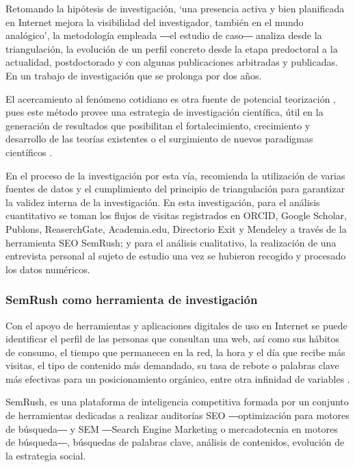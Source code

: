 \documentclass{textolivre}
\begin{document}
Retomando la hipótesis de investigación, ‘una presencia activa y bien planificada en Internet mejora la visibilidad del investigador, también en el mundo analógico’, la metodología empleada ―el estudio de caso― analiza desde la triangulación, la evolución de un perfil concreto desde la etapa predoctoral a la actualidad, postdoctorado y con algunas publicaciones arbitradas y publicadas. En un trabajo de investigación que se prolonga por dos años.

El acercamiento al fenómeno cotidiano es otra fuente de potencial teorización \cite{yacuzzi_estudio_2005}, pues este método provee una estrategia de investigación científica, útil en la generación de resultados que posibilitan el fortalecimiento, crecimiento y desarrollo de las teorías existentes o el surgimiento de nuevos paradigmas científicos \cite{martinez_carazo_metodo_2006}.

En el proceso de la investigación por esta vía, \textcite{martinez_carazo_metodo_2006} recomienda la utilización de varias fuentes de datos y el cumplimiento del principio de triangulación para garantizar la validez interna de la investigación. En esta investigación, para el análisis cuantitativo se toman los flujos de visitas registrados en ORCID, Google Scholar, Publons, ReaserchGate, Academia.edu, Directorio Exit y Mendeley a través de la herramienta SEO SemRush; y para el análisis cualitativo, la realización de una entrevista personal al sujeto de estudio una vez se hubieron recogido y procesado los datos numéricos.

\subsubsection{SemRush como herramienta de investigación}\label{sec-semrush}
Con el apoyo de herramientas y aplicaciones digitales de uso en Internet se puede identificar el perfil de las personas que consultan una web, así como sus hábitos de consumo, el tiempo que permanecen en la red, la hora y el día que recibe más visitas, el tipo de contenido más demandado, su tasa de rebote o palabras clave más efectivas para un posicionamiento orgánico, entre otra infinidad de variables \cite{fed_foro_de_economia_digital_herramientas_2016}.

SemRush, es una plataforma de inteligencia competitiva formada por un conjunto de herramientas dedicadas a realizar auditorías SEO ―optimización para motores de búsqueda― y SEM ―Search Engine Marketing o mercadotecnia en motores de búsqueda―, búsquedas de palabras clave, análisis de contenidos, evolución de la estrategia social.
\end{document}
